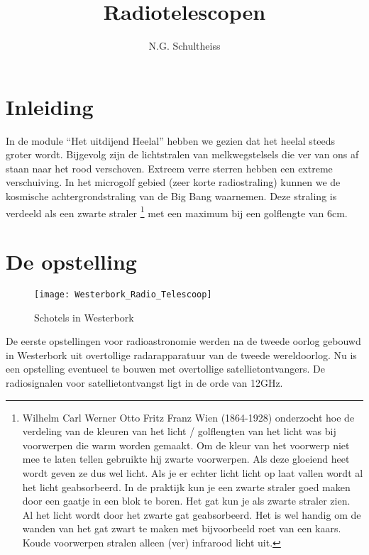 



\title{Radiotelescopen}
\author{N.G. Schultheiss}
\date{}

\maketitle
\thispagestyle{firststyle}

\section{Inleiding}

In de module ``Het uitdijend Heelal'' hebben we gezien dat het heelal
steeds groter wordt. Bijgevolg zijn de lichtstralen van melkwegstelsels
die ver van ons af staan naar het rood verschoven. Extreem verre sterren
hebben een extreme verschuiving. In het microgolf gebied (zeer korte
radiostraling) kunnen we de kosmische achtergrondstraling van de Big
Bang waarnemen. Deze straling is verdeeld als een zwarte straler
\footnote{Wilhelm Carl Werner Otto Fritz Franz Wien (1864-1928)
onderzocht hoe de verdeling van de kleuren van het licht / golflengten
van het licht was bij voorwerpen die warm worden gemaakt. Om de kleur
van het voorwerp niet mee te laten tellen gebruikte hij zwarte
voorwerpen. Als deze gloeiend heet wordt geven ze dus wel licht. Als je
er echter licht licht op laat vallen wordt al het licht geabsorbeerd. In
de praktijk kun je een zwarte straler goed maken door een gaatje in een
blok te boren. Het gat kun je als zwarte straler zien. Al het licht
wordt door het zwarte gat geabsorbeerd. Het is wel handig om de wanden
van het gat zwart te maken met bijvoorbeeld roet van een kaars. Koude
voorwerpen stralen alleen (ver) infrarood licht uit.} met een maximum
bij een golflengte van 6cm.


\section{De opstelling}

\begin{figure}[h]
\noindent \begin{centering}
\texttt{[image: Westerbork\_Radio\_Telescoop]}
\par\end{centering}

\caption{Schotels in Westerbork}
\end{figure}


De eerste opstellingen voor radioastronomie werden na de tweede oorlog
gebouwd in Westerbork uit overtollige radarapparatuur van de tweede
wereldoorlog. Nu is een opstelling eventueel te bouwen met overtollige
satellietontvangers. De radiosignalen voor satellietontvangst ligt
in de orde van 12GHz.


